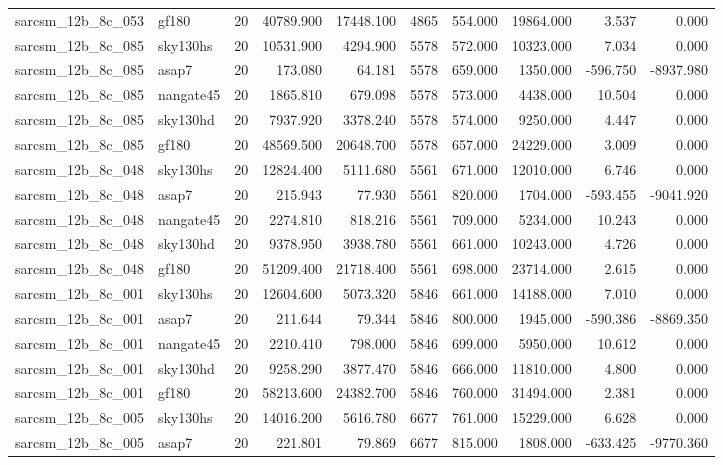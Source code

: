 \begin{tabular}{llrrrrrrrr}
sarcsm\_12b\_8c\_053 & gf180 & 20 & 40789.900 & 17448.100 & 4865 & 554.000 & 19864.000 & 3.537 & 0.000 \\
sarcsm\_12b\_8c\_085 & sky130hs & 20 & 10531.900 & 4294.900 & 5578 & 572.000 & 10323.000 & 7.034 & 0.000 \\
sarcsm\_12b\_8c\_085 & asap7 & 20 & 173.080 & 64.181 & 5578 & 659.000 & 1350.000 & -596.750 & -8937.980 \\
sarcsm\_12b\_8c\_085 & nangate45 & 20 & 1865.810 & 679.098 & 5578 & 573.000 & 4438.000 & 10.504 & 0.000 \\
sarcsm\_12b\_8c\_085 & sky130hd & 20 & 7937.920 & 3378.240 & 5578 & 574.000 & 9250.000 & 4.447 & 0.000 \\
sarcsm\_12b\_8c\_085 & gf180 & 20 & 48569.500 & 20648.700 & 5578 & 657.000 & 24229.000 & 3.009 & 0.000 \\
sarcsm\_12b\_8c\_048 & sky130hs & 20 & 12824.400 & 5111.680 & 5561 & 671.000 & 12010.000 & 6.746 & 0.000 \\
sarcsm\_12b\_8c\_048 & asap7 & 20 & 215.943 & 77.930 & 5561 & 820.000 & 1704.000 & -593.455 & -9041.920 \\
sarcsm\_12b\_8c\_048 & nangate45 & 20 & 2274.810 & 818.216 & 5561 & 709.000 & 5234.000 & 10.243 & 0.000 \\
sarcsm\_12b\_8c\_048 & sky130hd & 20 & 9378.950 & 3938.780 & 5561 & 661.000 & 10243.000 & 4.726 & 0.000 \\
sarcsm\_12b\_8c\_048 & gf180 & 20 & 51209.400 & 21718.400 & 5561 & 698.000 & 23714.000 & 2.615 & 0.000 \\
sarcsm\_12b\_8c\_001 & sky130hs & 20 & 12604.600 & 5073.320 & 5846 & 661.000 & 14188.000 & 7.010 & 0.000 \\
sarcsm\_12b\_8c\_001 & asap7 & 20 & 211.644 & 79.344 & 5846 & 800.000 & 1945.000 & -590.386 & -8869.350 \\
sarcsm\_12b\_8c\_001 & nangate45 & 20 & 2210.410 & 798.000 & 5846 & 699.000 & 5950.000 & 10.612 & 0.000 \\
sarcsm\_12b\_8c\_001 & sky130hd & 20 & 9258.290 & 3877.470 & 5846 & 666.000 & 11810.000 & 4.800 & 0.000 \\
sarcsm\_12b\_8c\_001 & gf180 & 20 & 58213.600 & 24382.700 & 5846 & 760.000 & 31494.000 & 2.381 & 0.000 \\
sarcsm\_12b\_8c\_005 & sky130hs & 20 & 14016.200 & 5616.780 & 6677 & 761.000 & 15229.000 & 6.628 & 0.000 \\
sarcsm\_12b\_8c\_005 & asap7 & 20 & 221.801 & 79.869 & 6677 & 815.000 & 1808.000 & -633.425 & -9770.360 \\

\end{tabular}
